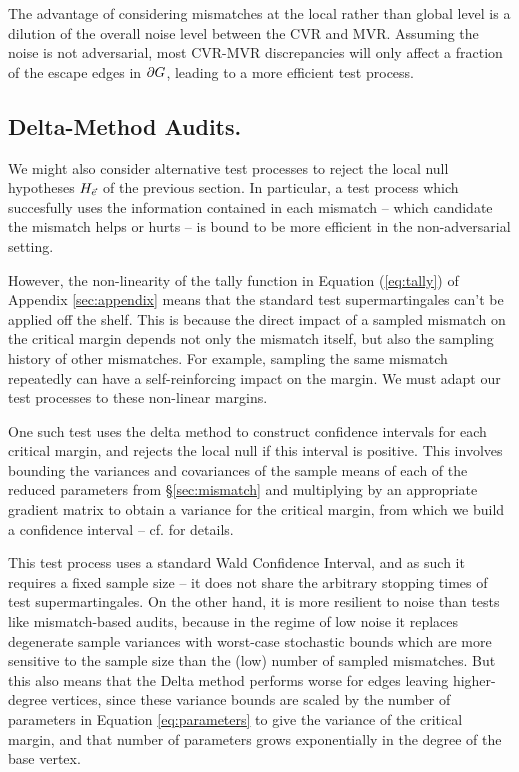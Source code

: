 The advantage of considering mismatches at the local rather than global level is a dilution of the overall noise level between the CVR and MVR.
Assuming the noise is not adversarial, most CVR-MVR discrepancies will only affect a fraction of the escape edges in $\partial G$, leading to a more efficient test process.
\subsection{Delta-Method Audits.}\label{sec:delta}

We might also consider alternative test processes to reject the local null hypotheses $H_{\ve}$ of the previous section.
In particular, a test process which succesfully uses the information contained in each mismatch -- which candidate the mismatch helps or hurts -- is bound to be more efficient in the non-adversarial setting.

However, the non-linearity of the tally function in Equation (\ref{eq:tally}) of Appendix \ref{sec:appendix} means that the standard test supermartingales can't be applied off the shelf.
This is because the direct impact of a sampled mismatch on the critical margin depends not only the mismatch itself, but also the sampling history of other mismatches.
For example, sampling the same mismatch repeatedly can have a self-reinforcing impact on the margin.
We must adapt our test processes to these non-linear margins.

One such test uses the delta method to construct confidence intervals for each critical margin, and rejects the local null if this interval is positive. 
This involves bounding the variances and covariances of the sample means of each of the reduced parameters from \S\ref{sec:mismatch} and multiplying by an appropriate gradient matrix to obtain a variance for the critical margin, from which we build a confidence interval -- cf. \cite{heitzmannGraphBasedAuditsMeek2026a} for details.

This test process uses a standard Wald Confidence Interval, and as such it requires a fixed sample size -- it does not share the arbitrary stopping times of test supermartingales.
On the other hand, it is more resilient to noise than tests like mismatch-based audits, because in the regime of low noise it replaces degenerate sample variances with worst-case stochastic bounds which are more sensitive to the sample size than the (low) number of sampled mismatches.
But this also means that the Delta method performs worse for edges leaving higher-degree vertices, since these variance bounds are scaled by the number of parameters in Equation \ref{eq:parameters} to give the variance of the critical margin, and that number of parameters grows exponentially in the degree of the base vertex.

